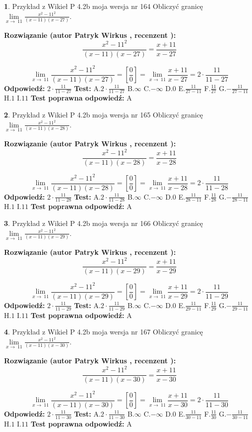 \documentclass[12pt, a4paper]{article}
\theoremstyle{definition} %
\newtheorem{zad}{}
\newcommand{\zadStart}[1]{\begin{zad}#1\newline}
\newcommand{\zadStop}{\end{zad}}
\newcommand{\rozwStart}[2]{\noindent \textbf{Rozwiązanie (autor #1 , recenzent #2): }\newline}
\newcommand{\rozwStop}{\newline}
\newcommand{\odpStart}{\noindent \textbf{Odpowiedź:}\newline}
\newcommand{\odpStop}{\newline}
\newcommand{\testStart}{\noindent \textbf{Test:}\newline}
\newcommand{\testStop}{\newline}
\newcommand{\kluczStart}{\noindent \textbf{Test poprawna odpowiedź:}\newline}
\newcommand{\kluczStop}{\newline}
\begin{document}
\zadStart{Przykład z Wikieł P 4.2b moja wersja nr 164}
Obliczyć granicę $\lim\limits_{x\to\ 11}\frac{x^{2}-11^{2}}{(x-11)(x-27)}$.
\zadStop
\rozwStart{Patryk Wirkus}{}
$$\frac{x^{2}-11^{2}}{(x-11)(x-27)}=\frac{x+11}{x-27}$$

$$\lim\limits_{x\to\ 11}\frac{x^{2}-11^{2}}{(x-11)(x-27)}=[\frac{0}{0}]=\lim\limits_{x\to\ 11}\frac{x+11}{x-27}=2 \cdot \frac{11}{11-27}$$
\rozwStop
\odpStart
$2 \cdot \frac{11}{11-27}$
\odpStop
\testStart
A.$2 \cdot \frac{11}{11-27}$
B.$\infty$
C.$-\infty$
D.$0$
E.$\frac{11}{27-11}$
F.$\frac{11}{27}$
G.$-\frac{11}{27-11}$
H.$1$
I.$11$
\testStop
\kluczStart
A
\kluczStop



\zadStart{Przykład z Wikieł P 4.2b moja wersja nr 165}
Obliczyć granicę $\lim\limits_{x\to\ 11}\frac{x^{2}-11^{2}}{(x-11)(x-28)}$.
\zadStop
\rozwStart{Patryk Wirkus}{}
$$\frac{x^{2}-11^{2}}{(x-11)(x-28)}=\frac{x+11}{x-28}$$

$$\lim\limits_{x\to\ 11}\frac{x^{2}-11^{2}}{(x-11)(x-28)}=[\frac{0}{0}]=\lim\limits_{x\to\ 11}\frac{x+11}{x-28}=2 \cdot \frac{11}{11-28}$$
\rozwStop
\odpStart
$2 \cdot \frac{11}{11-28}$
\odpStop
\testStart
A.$2 \cdot \frac{11}{11-28}$
B.$\infty$
C.$-\infty$
D.$0$
E.$\frac{11}{28-11}$
F.$\frac{11}{28}$
G.$-\frac{11}{28-11}$
H.$1$
I.$11$
\testStop
\kluczStart
A
\kluczStop



\zadStart{Przykład z Wikieł P 4.2b moja wersja nr 166}
Obliczyć granicę $\lim\limits_{x\to\ 11}\frac{x^{2}-11^{2}}{(x-11)(x-29)}$.
\zadStop
\rozwStart{Patryk Wirkus}{}
$$\frac{x^{2}-11^{2}}{(x-11)(x-29)}=\frac{x+11}{x-29}$$

$$\lim\limits_{x\to\ 11}\frac{x^{2}-11^{2}}{(x-11)(x-29)}=[\frac{0}{0}]=\lim\limits_{x\to\ 11}\frac{x+11}{x-29}=2 \cdot \frac{11}{11-29}$$
\rozwStop
\odpStart
$2 \cdot \frac{11}{11-29}$
\odpStop
\testStart
A.$2 \cdot \frac{11}{11-29}$
B.$\infty$
C.$-\infty$
D.$0$
E.$\frac{11}{29-11}$
F.$\frac{11}{29}$
G.$-\frac{11}{29-11}$
H.$1$
I.$11$
\testStop
\kluczStart
A
\kluczStop



\zadStart{Przykład z Wikieł P 4.2b moja wersja nr 167}
Obliczyć granicę $\lim\limits_{x\to\ 11}\frac{x^{2}-11^{2}}{(x-11)(x-30)}$.
\zadStop
\rozwStart{Patryk Wirkus}{}
$$\frac{x^{2}-11^{2}}{(x-11)(x-30)}=\frac{x+11}{x-30}$$

$$\lim\limits_{x\to\ 11}\frac{x^{2}-11^{2}}{(x-11)(x-30)}=[\frac{0}{0}]=\lim\limits_{x\to\ 11}\frac{x+11}{x-30}=2 \cdot \frac{11}{11-30}$$
\rozwStop
\odpStart
$2 \cdot \frac{11}{11-30}$
\odpStop
\testStart
A.$2 \cdot \frac{11}{11-30}$
B.$\infty$
C.$-\infty$
D.$0$
E.$\frac{11}{30-11}$
F.$\frac{11}{30}$
G.$-\frac{11}{30-11}$
H.$1$
I.$11$
\testStop
\kluczStart
A
\kluczStop
\end{document}
